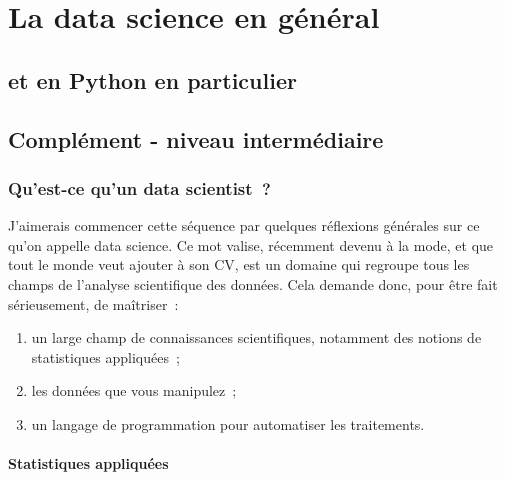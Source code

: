     
    
    
    

    

    \hypertarget{la-data-science-en-guxe9nuxe9ral}{%
\section{La data science en
général}\label{la-data-science-en-guxe9nuxe9ral}}

\hypertarget{et-en-python-en-particulier}{%
\subsection{et en Python en
particulier}\label{et-en-python-en-particulier}}

    \hypertarget{compluxe9ment---niveau-intermuxe9diaire}{%
\subsection{Complément - niveau
intermédiaire}\label{compluxe9ment---niveau-intermuxe9diaire}}

    \hypertarget{quest-ce-quun-data-scientist}{%
\subsubsection{Qu'est-ce qu'un data
scientist~?}\label{quest-ce-quun-data-scientist}}

    J'aimerais commencer cette séquence par quelques réflexions générales
sur ce qu'on appelle data science. Ce mot valise, récemment devenu à la
mode, et que tout le monde veut ajouter à son CV, est un domaine qui
regroupe tous les champs de l'analyse scientifique des données. Cela
demande donc, pour être fait sérieusement, de maîtriser~:

\begin{enumerate}
\def\labelenumi{\arabic{enumi}.}
\tightlist
\item
  un large champ de connaissances scientifiques, notamment des notions
  de statistiques appliquées~;
\item
  les données que vous manipulez~;
\item
  un langage de programmation pour automatiser les traitements.
\end{enumerate}

    \hypertarget{statistiques-appliquuxe9es}{%
\paragraph{Statistiques appliquées}\label{statistiques-appliquuxe9es}}

